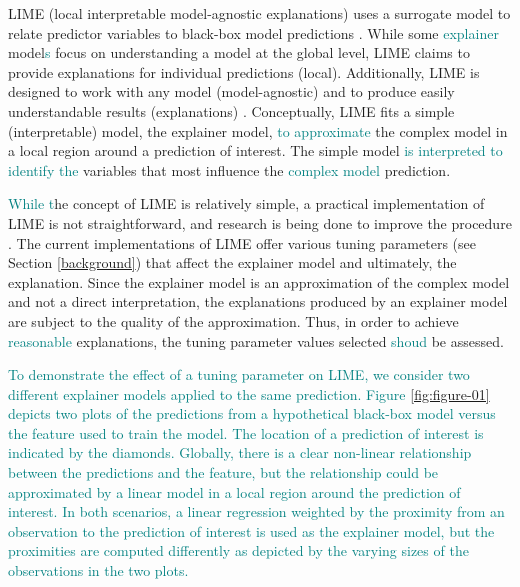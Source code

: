 \documentclass[AMS,STIX2COL]{WileyNJD-v2}\usepackage[]{graphicx}\usepackage[]{color}
\newcommand{\kge}[1]{\textcolor{teal}{#1}}
\renewcommand{\sout}[1]{\unskip}
\begin{document}
LIME (local interpretable model-agnostic explanations) \sout{is a method that} uses a surrogate model to relate predictor variables to black-box model predictions \sout{(i.e. a model explainer)} \citep{ribeiro:2016}. \sout{We distinguish between the terms of model explainer and explainer model: by \emph{model explainer} we denote the method for explaining a complex model using a surrogate model, while the \emph{explainer model}, or simply the \emph{explainer}, is the surrogate model.} While some \kge{explainer} model\kge{s} \sout{explainers} focus on understanding a model at the global level, LIME claims to provide explanations for individual predictions (local). Additionally, LIME is designed to work with any model (model-agnostic) and to produce easily understandable results (explanations) \citep{ribeiro:2016}. Conceptually, LIME fits a simple (interpretable) model, the explainer model, \kge{to approximate} \sout{meant to capture the behavior of} the \sout{(}complex\sout{) black-box} model in a local region around a prediction of interest. The simple model \kge{is interpreted to identify the} \sout{then provides interpretable estimates for} variables that most influence\sout{d} the \kge{complex model} prediction\sout{made by the complex model}.

\kge{While t}\sout{T}he concept of LIME is relatively simple\sout{: use an interpretable model to approximate a complex model in a local region. However}, a practical implementation of LIME is not straightforward, and research is being done to improve the procedure \citep{laugel:2018}. The current implementations of LIME \citep{pedersen:2020} \citep{ribeiro:2020} offer various tuning parameters (see Section \ref{background}) that affect the explainer model and ultimately, the explanation. Since the explainer model is an approximation of the complex model and not a direct interpretation, the explanations produced by an explainer model are subject to the quality of the approximation. Thus, in order to achieve \kge{reasonable} \sout{accurate} explanations, the tuning parameter values selected \kge{shoud} \sout{need to} be assessed.

\kge{To demonstrate the effect of a tuning parameter on LIME, we consider two different explainer models applied to the same prediction. Figure \ref{fig:figure-01} depicts two plots of the predictions from a hypothetical black-box model versus the feature used to train the model. The location of a prediction of interest is indicated by the diamonds. Globally, there is a clear non-linear relationship between the predictions and the feature, but the relationship could be approximated by a linear model in a local region around the prediction of interest. In both scenarios, a linear regression weighted by the proximity from an observation to the prediction of interest is used as the explainer model, but the proximities are computed differently as depicted by the varying sizes of the observations in the two plots.} 
\end{document}
